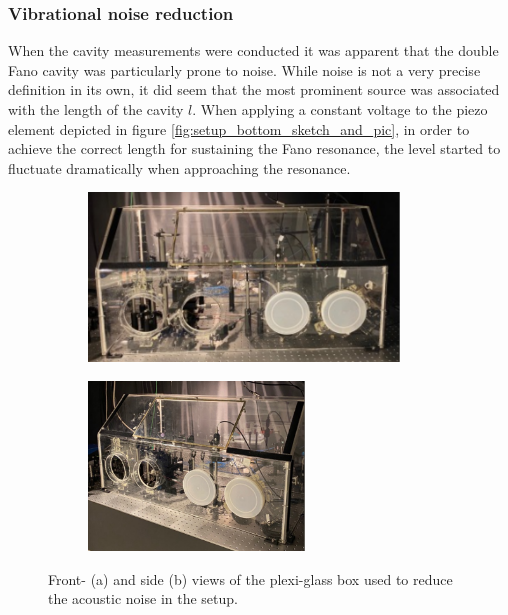 \subsubsection{Vibrational noise reduction}\label{sec:vibrational_noise_reduction}

When the cavity measurements were conducted it was apparent that the double Fano cavity was particularly prone to noise. While noise is not a very precise definition in its own, it did seem that the most prominent source was associated with the length of the cavity $l$. When applying a constant voltage to the piezo element depicted in figure \ref{fig:setup_bottom_sketch_and_pic}, in order to achieve the correct length for sustaining the Fano resonance, the level started to fluctuate dramatically when approaching the resonance. 

\begin{figure}[h!]
    \centering
    \begin{subfigure}[b]{0.49\textwidth}
        \centering
        \includegraphics[height=4.5cm]{figures/noise_box_front.pdf}
        \caption{}
        \label{fig:box_front}
    \end{subfigure}
    \begin{subfigure}[b]{0.49\textwidth}
        \centering
        \includegraphics[height=4.5cm]{figures/noise_box_side.pdf}
        \caption{}
        \label{fig:box_side}
    \end{subfigure}
    \caption{Front- (a) and side (b) views of the plexi-glass box used to reduce the acoustic noise in the setup.}
    \label{fig:noise_box}
\end{figure}

